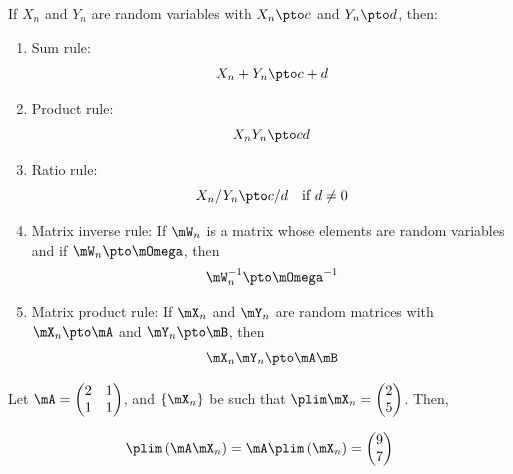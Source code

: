 \begin{theorem}\label{teo:rules_pto}
  If $X_n$ and $Y_n$ are random variables with $X_n \pto c$ and $Y_n\pto d$, then:
  
  \begin{enumerate}
    \item Sum rule:
        \begin{equation}
            X_n + Y_n \pto c + d
        \end{equation}
    \item Product rule:
        \begin{equation}
            X_nY_n \pto cd
        \end{equation}
    \item Ratio rule:
        \begin{equation}
            X_n/Y_n \pto c/d \quad \mbox{if $d\neq 0$}
        \end{equation}
    \item Matrix inverse rule: If $\mW_n$ is a matrix whose elements are random variables and if $\mW_n\pto \mOmega$, then
        \begin{equation}
          \mW_n^{-1}\pto \mOmega^{-1}
        \end{equation}
    \item Matrix product rule: If $\mX_n$ and $\mY_n$ are random matrices with $\mX_n\pto \mA$ and $\mY_n\pto \mB$, then
        \begin{equation}
          \mX_n\mY_n\pto \mA\mB
        \end{equation}
  \end{enumerate}
\end{theorem}

\begin{example}
Let $\mA = \begin{pmatrix} 2 & 1 \\ 1 & 1 \end{pmatrix}$, and $\left\lbrace \mX_n \right\rbrace$ be such that $\plim \mX_n = \begin{pmatrix} 2 \\ 5 \end{pmatrix}$. Then, 

\begin{equation*}
  \plim\left(\mA\mX_n\right) = \mA\plim\left(\mX_n\right) = \begin{pmatrix} 9 \\ 7 \end{pmatrix}
\end{equation*}
\end{example}

